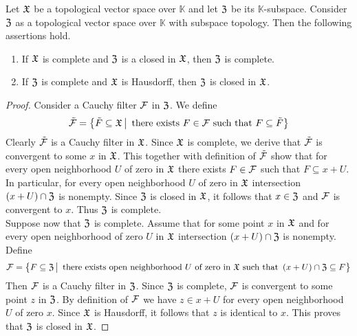 \begin{theorem}\label{theorem:complete_subspaces_of_topological_vector_spaces}
Let ${\mathfrak X}$ be a topological vector space over $\mathbb{K}$ and let ${\mathfrak Z}$ be its $\mathbb{K}$-subspace. Consider ${\mathfrak Z}$ as a topological vector space over $\mathbb{K}$ with subspace topology. Then the following assertions hold.
\begin{enumerate}[label=\emph{\textbf{(\arabic*)}}, leftmargin=*]
\item If ${\mathfrak X}$ is complete and ${\mathfrak Z}$ is a closed in ${\mathfrak X}$, then ${\mathfrak Z}$ is complete.
\item If ${\mathfrak Z}$ is complete and ${\mathfrak X}$ is Hausdorff, then ${\mathfrak Z}$ is closed in ${\mathfrak X}$.
\end{enumerate}
\end{theorem}
\begin{proof}
Consider a Cauchy filter ${\mathcal F}$ in ${\mathfrak Z}$. We define
$$\tilde{{\mathcal F}} = \big\{\tilde{F}\subseteq {\mathfrak X}\,\big|\,\mbox{ there exists }F\in {\mathcal F}\mbox{ such that }F\subseteq \tilde{F}\big\}$$
Clearly $\tilde{{\mathcal F}}$ is a Cauchy filter in ${\mathfrak X}$. Since ${\mathfrak X}$ is complete, we derive that $\tilde{{\mathcal F}}$ is convergent to some $x$ in ${\mathfrak X}$. This together with definition of $\tilde{{\mathcal F}}$ show that for every open neighborhood $U$ of zero in ${\mathfrak X}$ there exists $F \in {\mathcal F}$ such that $F \subseteq x + U$. In particular, for every open neighborhood $U$ of zero in ${\mathfrak X}$ intersection $\left(x + U\right)\cap {\mathfrak Z}$ is nonempty. Since ${\mathfrak Z}$ is closed in ${\mathfrak X}$, it follows that $x \in {\mathfrak Z}$ and ${\mathcal F}$ is convergent to $x$. Thus ${\mathfrak Z}$ is complete.\\
Suppose now that ${\mathfrak Z}$ is complete. Assume that for some point $x$ in ${\mathfrak X}$ and for every open neighborhood of zero $U$ in ${\mathfrak X}$ intersection $\left(x + U\right) \cap {\mathfrak Z}$ is nonempty. Define
$${\mathcal F} = \big\{F \subseteq {\mathfrak Z}\,\big|\,\mbox{ there exists open neighborhood }U\mbox{ of zero in }{\mathfrak X}\mbox{ such that }\left(x + U\right) \cap {\mathfrak Z} \subseteq F\big\}$$
Then ${\mathcal F}$ is a Cauchy filter in ${\mathfrak Z}$. Since ${\mathfrak Z}$ is complete, ${\mathcal F}$ is convergent to some point $z$ in ${\mathfrak Z}$. By definition of ${\mathcal F}$ we have $z \in x + U$ for every open neighborhood $U$ of zero $x$. Since ${\mathfrak X}$ is Hausdorff, it follows that $z$ is identical to $x$. This proves that ${\mathfrak Z}$ is closed in ${\mathfrak X}$.  
\end{proof}

